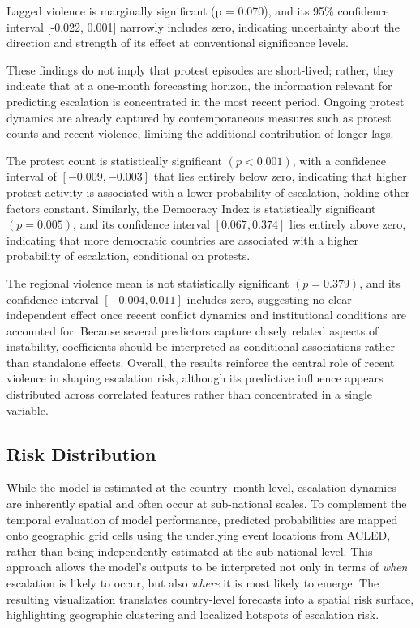 \documentclass[12pt]{article}
\begin{document}
Lagged violence is marginally significant (p = 0.070), and its 95\% confidence interval [-0.022, 0.001] narrowly includes zero, indicating uncertainty about the direction and strength of its effect at conventional significance levels.

These findings do not imply that protest episodes are short-lived; rather, they indicate that at a one-month forecasting horizon, the information relevant for predicting escalation is concentrated in the most recent period. Ongoing protest dynamics are already captured by contemporaneous measures such as protest counts and recent violence, limiting the additional contribution of longer lags.

The protest count is statistically significant $(p < 0.001)$, with a confidence interval of $[-0.009, -0.003]$ that lies entirely below zero, indicating that higher protest activity is associated with a lower probability of escalation, holding other factors constant. Similarly, the Democracy Index is statistically significant $(p = 0.005)$, and its confidence interval $[0.067, 0.374]$ lies entirely above zero, indicating that more democratic countries are associated with a higher probability of escalation, conditional on protests.

The regional violence mean is not statistically significant $(p = 0.379)$, and its confidence interval $[-0.004, 0.011]$ includes zero, suggesting no clear independent effect once recent conflict dynamics and institutional conditions are accounted for. Because several predictors capture closely related aspects of instability, coefficients should be interpreted as conditional associations rather than standalone effects. Overall, the results reinforce the central role of recent violence in shaping escalation risk, although its predictive influence appears distributed across correlated features rather than concentrated in a single variable.

\subsection{Risk Distribution}
\label{sec:risk_dist}

While the model is estimated at the country–month level, escalation dynamics are inherently spatial and often occur at sub-national scales. To complement the temporal evaluation of model performance, predicted probabilities are mapped onto geographic grid cells using the underlying event locations from ACLED, rather than being independently estimated at the sub-national level. This approach allows the model’s outputs to be interpreted not only in terms of \textit{when} escalation is likely to occur, but also \textit{where} it is most likely to emerge. The resulting visualization translates country-level forecasts into a spatial risk surface, highlighting geographic clustering and localized hotspots of escalation risk.
\end{document}
